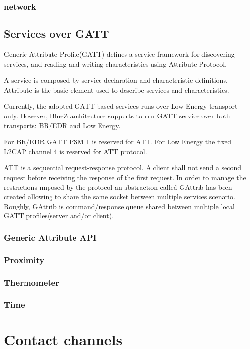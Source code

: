\documentclass[11pt]{article}
\begin{document}
\subsubsection{network}

\subsection{Services over GATT}

Generic Attribute Profile(GATT) defines a service framework for discovering
services, and reading and writing characteristics using Attribute Protocol.

A service is composed by service declaration and characteristic definitions.
Attribute is the basic element used to describe services and characteristics.

Currently, the adopted GATT based services runs over Low Energy transport only.
However, BlueZ architecture supports to run GATT service over both transports:
BR/EDR and Low Energy.

For BR/EDR GATT PSM 1 is reserved for ATT. For Low Energy the fixed L2CAP
channel 4 is reserved for ATT protocol.

ATT is a sequential request-response protocol. A client shall not send a
second request before receiving the response of the first request. In order
to manage the restrictions imposed by the protocol an abstraction called
GAttrib has been created allowing to share the same socket between multiple
services scenario. Roughly, GAttrib is command/response queue shared between
multiple local GATT profiles(server and/or client).

\subsubsection{Generic Attribute API}
\subsubsection{Proximity}
\subsubsection{Thermometer}
\subsubsection{Time}

\section{Contact channels}
\end{document}
